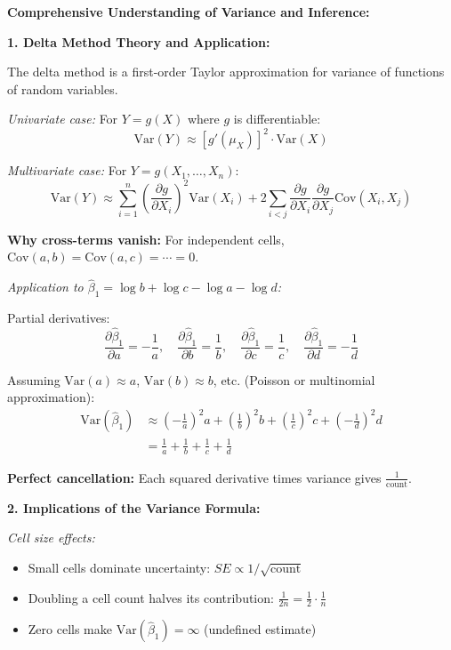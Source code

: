 \documentclass[12pt]{article}
\begin{document}
\begin{explanation}
\textbf{Comprehensive Understanding of Variance and Inference:}

\textbf{1. Delta Method Theory and Application:}

The delta method is a first-order Taylor approximation for variance of functions of random variables.

\textit{Univariate case:} For $Y = g(X)$ where $g$ is differentiable:
\[
\text{Var}(Y) \approx [g'(\mu_X)]^2 \cdot \text{Var}(X)
\]

\textit{Multivariate case:} For $Y = g(X_1, \ldots, X_n)$:
\[
\text{Var}(Y) \approx \sum_{i=1}^{n} \left(\frac{\partial g}{\partial X_i}\right)^2 \text{Var}(X_i) + 2\sum_{i<j} \frac{\partial g}{\partial X_i}\frac{\partial g}{\partial X_j}\text{Cov}(X_i, X_j)
\]

\textbf{Why cross-terms vanish:} For independent cells, $\text{Cov}(a,b) = \text{Cov}(a,c) = \cdots = 0$.

\textit{Application to $\hat{\beta}_1 = \log b + \log c - \log a - \log d$:}

Partial derivatives:
\[
\frac{\partial \hat{\beta}_1}{\partial a} = -\frac{1}{a}, \quad \frac{\partial \hat{\beta}_1}{\partial b} = \frac{1}{b}, \quad \frac{\partial \hat{\beta}_1}{\partial c} = \frac{1}{c}, \quad \frac{\partial \hat{\beta}_1}{\partial d} = -\frac{1}{d}
\]

Assuming $\text{Var}(a) \approx a$, $\text{Var}(b) \approx b$, etc. (Poisson or multinomial approximation):
\begin{align*}
\text{Var}(\hat{\beta}_1) &\approx \left(-\frac{1}{a}\right)^2 a + \left(\frac{1}{b}\right)^2 b + \left(\frac{1}{c}\right)^2 c + \left(-\frac{1}{d}\right)^2 d \\
&= \frac{1}{a} + \frac{1}{b} + \frac{1}{c} + \frac{1}{d}
\end{align*}

\textbf{Perfect cancellation:} Each squared derivative times variance gives $\frac{1}{\text{count}}$.

\textbf{2. Implications of the Variance Formula:}

\textit{Cell size effects:}
\begin{itemize}
\item Small cells dominate uncertainty: $SE \propto 1/\sqrt{\text{count}}$
\item Doubling a cell count halves its contribution: $\frac{1}{2n} = \frac{1}{2} \cdot \frac{1}{n}$
\item Zero cells make $\text{Var}(\hat{\beta}_1) = \infty$ (undefined estimate)
\end{itemize}


\end{explanation}
\end{document}
